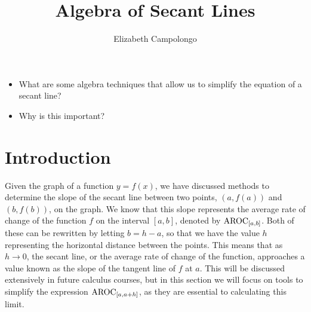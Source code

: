 \documentclass{ximera}
\author{Elizabeth Campolongo}
\title{Algebra of Secant Lines}
\begin{document}
\begin{abstract}
  
\end{abstract}
\maketitle



\begin{motivatingQuestions}\begin{itemize}
\item What are some algebra techniques that allow us to simplify the equation of a secant line?
\item Why is this important?
\end{itemize}\end{motivatingQuestions}



\section{Introduction}

Given the graph of a function $y = f(x)$, we have discussed methods to determine the slope of the secant line between two points, $(a,f(a))$ and $(b,f(b))$, on the graph. We know that this slope represents the average rate of change of the function $f$ on the interval $[a,b]$, denoted by $\mathrm{AROC}_{[a,b]}$. Both of these can be rewritten by letting $b = h-a$, so that we have the value $h$ representing the horizontal distance between the points. This means that as $h\rightarrow 0$, the secant line, or the average rate of change of the function, approaches a value known as the slope of the tangent line of $f$ at $a$. This will be discussed extensively in future calculus courses, but in this section we will focus on tools to simplify the expression $\mathrm{AROC}_{[a,a+h]}$, as they are essential to calculating this limit.
\end{document}
